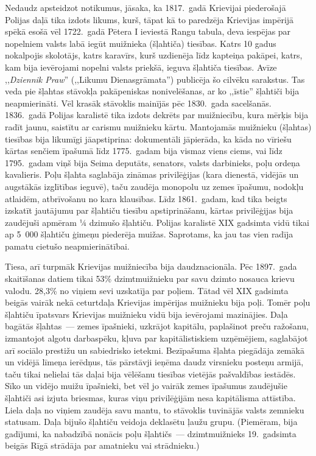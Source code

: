 \documentclass[twoside,a5paper,12pt,fleqn,openany]{extbook}
\newcommand{\pltxti}[1]{\textit{\textpolish{#1}}}
\begin{document}
Nedaudz apsteidzot notikumus, jāsaka, ka 1817.~gadā Krievijai piederošajā Polijas daļā tika izdots likums, kurš, tāpat kā to paredzēja Krievijas impērijā spēkā esošā vēl 1722.~gadā Pētera I ieviestā Rangu tabula, deva iespējas par nopelniem valsts labā iegūt muižnieka (šļahtiča) tiesības. Katrs 10 gadus nokalpojis skolotājs, katrs karavīrs, kurš uzdienēja līdz kapteiņa pakāpei, katrs, kam bija ievērojami nopelni valsts priekšā, ieguva šļahtiča tiesības. Avīze ,,\pltxti{Dziennik Praw}'' (,,Likumu Dienasgrāmata'') publicēja šo cilvēku sarakstus. Tas veda pie šļahtas stāvokļa pakāpeniskas nonivelēšanas, ar ko ,,īstie'' šļahtiči bija neapmierināti. Vēl krasāk stāvoklis mainījās pēc 1830.~gada sacelšanās. 1836.~gadā Polijas karalistē tika izdots dekrēts par muižniecību, kura mērķis bija radīt jaunu, saistītu ar carismu muižnieku kārtu. Mantojamās muižnieku (šļahtas) tiesības bija likumīgi jāapstiprina: dokumentāli jāpierāda, ka kāda no vīriešu kārtas senčiem īpašumā līdz 1775.~gadam bija vismaz viens ciems, vai līdz 1795.~gadam viņš bija Seima deputāts, senators, valsts darbinieks, poļu ordeņa kavalieris. Poļu šļahta saglabāja zināmas privilēģijas (kara dienestā, vidējās un augstākās izglītības ieguvē), taču zaudēja monopolu uz zemes īpašumu, nodokļu atlaidēm, atbrīvošanu no kara klausības. Līdz 1861.~gadam, kad tika beigts izskatīt jautājumu par šļahtiču tiesību apstiprināšanu, kārtas privilēģijas bija zaudējuši apmēram ¼ dzimušo šļahtiču. Polijas karalistē XIX gadsimta vidū tikai ap 5~000 šļahtiču ģimeņu piederēja muižas. Saprotams, ka jau tas vien radīja pamatu cietušo neapmierinātībai.

Tiesa, arī turpmāk Krievijas muižniecība bija daudznacionāla. Pēc 1897.~gada skaitīšanas datiem tikai 53\% dzimtmuižnieku par savu dzimto nosauca krievu valodu. 28,3\% no viņiem sevi uzskatīja par poļiem. Tātad vēl XIX gadsimta beigās vairāk nekā ceturtdaļa Krievijas impērijas muižnieku bija poļi. Tomēr poļu šļahtiču īpatsvars Krievijas muižnieku vidū bija ievērojami mazinājies. Daļa bagātās šļahtas~--- zemes īpašnieki, uzkrājot kapitālu, paplašinot preču ražošanu, izmantojot algotu darbaspēku, kļuva par kapitālistiskiem uzņēmējiem, saglabājot arī sociālo prestižu un sabiedrisko ietekmi. Bezīpašuma šļahta piegādāja zemākā un vidējā līmeņa ierēdņus, tās pārstāvji ieņēma daudz virsnieku posteņu armijā, taču tikai nelielai tās daļai bija vēlēšanu tiesības vietējās pašvaldības iestādēs. Sīko un vidējo muižu īpašnieki, bet vēl jo vairāk zemes īpašumus zaudējušie šļahtiči asi izjuta briesmas, kuras viņu privilēģijām nesa kapitālisma attīstība. Liela daļa no viņiem zaudēja savu mantu, to stāvoklis tuvinājās valsts zemnieku statusam. Daļa bijušo šļahtiču veidoja deklasētu ļaužu grupu. (Piemēram, bija gadījumi, ka nabadzībā nonācis poļu šļahtičs~--- dzimtmuižnieks 19.~gadsimta beigās Rīgā strādāja par amatnieku vai strādnieku.)
\end{document}

